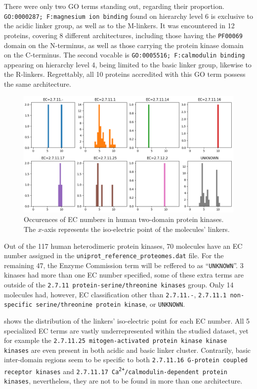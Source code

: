 		There were only two GO terms standing out, regarding their proportion.
		\texttt{GO:0000287; F:magnesium ion binding} found on hierarchy level 6 is exclusive
		to the acidic linker group, as well as to the M-linkers.
		It was encountered in 12 proteins, covering 8 different architectures, including those
		having the \texttt{PF00069} domain on the N-terminus, as well as those carrying the
		protein kinase domain on the C-terminus.
		The second vocable is \texttt{GO:0005516; F:calmodulin binding} appearing on hierarchy
		level 4, being limited to the basic linker group, likewise to the R-linkers.
		Regrettably, all 10 proteins accredited with this GO term possess the same
		architecture.

	\label{res:first:ec}

		\begin{figure}
			\centering
			\includegraphics[width=\linewidth]{img/iso_density_ec.png}
			\caption{Occurences of EC numbers in human two-domain protein kinases. The $x$-axis
			represents the iso-electric point of the molecules' linkers.}
			\label{fig:ec}
		\end{figure}

		Out of the 117 human heterodimeric protein kinases, 70 molecules have an EC number
		assigned in the \texttt{uniprot\_reference\_proteomes.dat} file.
		For the remaining 47, the Enzyme Commission term will be reffered to as
		``\texttt{UNKNOWN}''.
		3 kinases had more than one EC number specified, some of these extra terms are
		outside of the \texttt{2.7.11 protein-serine/threonine kinases} group.
		Only 14 molecules had, however, EC classification other than \texttt{2.7.11.-},
		\texttt{2.7.11.1 non-specific serine/threonine protein kinase}, or \texttt{UNKNOWN}.

		 shows the distribution of the linkers' iso-electric point for each EC
		number.
		All 5 specialized EC terms are vastly underrepresented within the studied dataset, yet
		for example the \texttt{2.7.11.25 mitogen-activated protein kinase kinase kinases}
		are even present in both acidic and basic linker cluster.
		Contrarily, basic inter-domain regions seem to be specific to both \texttt{2.7.11.16
		G-protein coupled receptor kinases} and
		\texttt{2.7.11.17 Ca\textsuperscript{2+}/calmodulin-dependent protein kinases},
		nevertheless, they are not to be found in more than one architecture.

